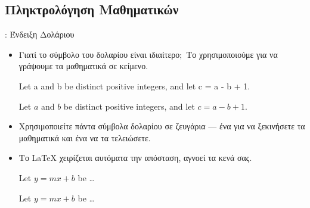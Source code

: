\documentclass{beamer}
\begin{document}
\subsection{Πληκτρολόγηση Μαθηματικών}
\begin{frame}[fragile]{\insertsubsection{}: Ένδειξη Δολάριου}
\begin{itemize}
\item Γιατί το σύμβολο του δολαρίου \keystrokett{\$} είναι ιδιαίτερο$;$ Το χρησιμοποιούμε για να γράψουμε τα μαθηματικά σε κείμενο.\\[1ex]
\en
\begin{exampletwouptiny}
Let a and b be distinct positive
integers, and let c = a - b + 1.

Let $a$ and $b$ be distinct positive
integers, and let $c = a - b + 1$.
\end{exampletwouptiny}
\gr
\item Χρησιμοποιείτε πάντα σύμβολα δολαρίου σε ζευγάρια --- ένα για να ξεκινήσετε τα μαθηματικά και ένα
να τα τελειώσετε.
\item Το \LaTeX{} χειρίζεται αυτόματα την απόσταση, αγνοεί τα κενά σας.
\en
\begin{exampletwouptiny}
Let $y=mx+b$ be \ldots

Let $y = m x + b$ be \ldots
\end{exampletwouptiny}
\end{itemize}
\end{frame}
\gr
\end{document}
